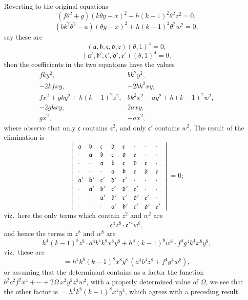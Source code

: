 \documentclass[11pt,a4paper]{article}
\begin{document}
Reverting to the original equations
\[
(f\theta^{2} + g)(k\theta y - x)^{2} + h(k - 1)^{2}\theta^{2} z^{2} = 0,
\]
\[
(bk^{2}\theta^{2} - a)(\theta y - x)^{2} + h(k - 1)^{2}\theta^{2} w^{2} = 0,
\]
say these are
\[
(\mathfrak{a}, \mathfrak{b}, \mathfrak{c}, \mathfrak{d}, \mathfrak{e})(\theta, 1)^{4} = 0,
\]
\[
(\mathfrak{a}', \mathfrak{b}', \mathfrak{c}', \mathfrak{d}', \mathfrak{e}')(\theta, 1)^{4} = 0,
\]
then the coefficients in the two equations have the values
\[
\begin{array}{ll}
fky^{2}, & bk^{2}y^{2}, \\
-2kfxy, & -2bk^{2}xy, \\
fx^{2} + gky^{2} + h(k - 1)^{2} z^{2}, & bk^{2}x^{2} - ay^{2} + h(k - 1)^{2} w^{2}, \\
-2gkxy, & 2axy, \\
gx^{2}, & -ax^{2},
\end{array}
\]
where observe that only $\mathfrak{c}$ contains $z^{2}$, and only $\mathfrak{c}'$ contains $w^{2}$. The result of the elimination is
\[
\begin{vmatrix}
\mathfrak{a} & \mathfrak{b} & \mathfrak{c} & \mathfrak{d} & \mathfrak{e} & \cdot & \cdot & \cdot \\
\cdot & \mathfrak{a} & \mathfrak{b} & \mathfrak{c} & \mathfrak{d} & \mathfrak{e} & \cdot & \cdot \\
\cdot & \cdot & \mathfrak{a} & \mathfrak{b} & \mathfrak{c} & \mathfrak{d} & \mathfrak{e} & \cdot \\
\cdot & \cdot & \cdot & \mathfrak{a} & \mathfrak{b} & \mathfrak{c} & \mathfrak{d} & \mathfrak{e} \\
\mathfrak{a}' & \mathfrak{b}' & \mathfrak{c}' & \mathfrak{d}' & \mathfrak{e}' & \cdot & \cdot & \cdot \\
\cdot & \mathfrak{a}' & \mathfrak{b}' & \mathfrak{c}' & \mathfrak{d}' & \mathfrak{e}' & \cdot & \cdot \\
\cdot & \cdot & \mathfrak{a}' & \mathfrak{b}' & \mathfrak{c}' & \mathfrak{d}' & \mathfrak{e}' & \cdot \\
\cdot & \cdot & \cdot & \mathfrak{a}' & \mathfrak{b}' & \mathfrak{c}' & \mathfrak{d}' & \mathfrak{e}'
\end{vmatrix} = 0;
\]
viz.\ here the only terms which contain $z^{2}$ and $w^{2}$ are
\[
\mathfrak{c}^{4}z^{8} \cdot \mathfrak{c}'^{4} w^{8},
\]
and hence the terms in $z^{8}$ and $w^{8}$ are
\[
h^{4}(k - 1)^{8} z^{8} \cdot a^{4} b^{4} k^{8} x^{8} y^{8} + h^{4}(k - 1)^{8} w^{8} \cdot f^{4} g^{4} k^{4} x^{8} y^{8},
\]
viz.\ these are
\[
= h^{4} k^{8}(k - 1)^{8} x^{8} y^{8}\,(a^{4} b^{4} z^{8} + f^{4} g^{4} w^{8}),
\]
or assuming that the determinant contains as a factor the function $b^{2}c^{2}f^{2}x^{4} + \cdots + 2\Omega\, x^{2}y^{2}z^{2}w^{2}$, with a properly determined value of $\Omega$, we see that the other factor is $= h^{4}k^{8}(k - 1)^{8} x^{4}y^{4}$, which agrees with a preceding result.
\end{document}
